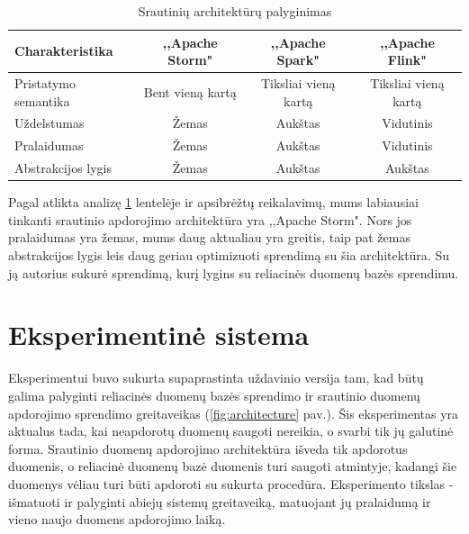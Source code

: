 \documentclass{VUMIFPSkursinis}
\begin{document}
\begin{table}[!htbp]
    \begin{center}
        \caption{Srautinių architektūrų palyginimas}
        \label{table:comparer}
        \begin{tabular}{ | l | c | c | c | } 
            \hline
            Charakteristika & ,,Apache Storm" & ,,Apache Spark" & ,,Apache Flink" \\* \hline
            Pristatymo semantika & Bent vieną kartą & Tiksliai vieną kartą & Tiksliai vieną kartą \\* \hline
            Uždelstumas & Žemas & Aukštas & Vidutinis \\* \hline
            Pralaidumas & Žemas & Aukštas & Vidutinis \\* \hline
            Abstrakcijos lygis & Žemas & Aukštas & Aukštas \\* \hline
        \end{tabular}
    \end{center}
\end{table}\par

Pagal atlikta analizę \ref{table:comparer} lentelėje ir apsibrėžtų reikalavimų, mums labiausiai tinkanti srautinio apdorojimo architektūra yra ,,Apache Storm". 
Nors jos pralaidumas yra žemas, mums daug aktualiau yra greitis, taip pat žemas abstrakcijos lygis leis daug geriau optimizuoti sprendimą su šia architektūra. Su ją autorius
sukurė sprendimą, kurį lygins su reliacinės duomenų bazės sprendimu.

\section{Eksperimentinė sistema}

Eksperimentui buvo sukurta supaprastinta uždavinio versija tam, kad būtų galima palyginti reliacinės duomenų bazės sprendimo ir srautinio duomenų 
apdorojimo sprendimo greitaveikas (\ref{fig:architecture} pav.).
Šis eksperimentas yra aktualus tada, kai neapdorotų duomenų saugoti nereikia, o svarbi tik jų galutinė forma. Srautinio duomenų apdorojimo architektūra
išveda tik apdorotus duomenis, o reliacinė duomenų bazė duomenis turi saugoti atmintyje, kadangi šie duomenys vėliau turi būti apdoroti su sukurta 
procedūra. Eksperimento tikslas - išmatuoti ir palyginti abiejų sistemų greitaveiką, matuojant jų pralaidumą ir vieno naujo duomens apdorojimo laiką.
\end{document}
